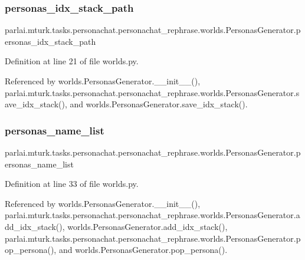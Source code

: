 \subsubsection{\texorpdfstring{personas\+\_\+idx\+\_\+stack\+\_\+path}{personas\_idx\_stack\_path}}
{\footnotesize\ttfamily parlai.\+mturk.\+tasks.\+personachat.\+personachat\+\_\+rephrase.\+worlds.\+Personas\+Generator.\+personas\+\_\+idx\+\_\+stack\+\_\+path}



Definition at line 21 of file worlds.\+py.



Referenced by worlds.\+Personas\+Generator.\+\_\+\+\_\+init\+\_\+\+\_\+(), parlai.\+mturk.\+tasks.\+personachat.\+personachat\+\_\+rephrase.\+worlds.\+Personas\+Generator.\+save\+\_\+idx\+\_\+stack(), and worlds.\+Personas\+Generator.\+save\+\_\+idx\+\_\+stack().

\mbox{\label{classparlai_1_1mturk_1_1tasks_1_1personachat_1_1personachat__rephrase_1_1worlds_1_1PersonasGenerator_ab4a565162feafbcbc20f9f6029c41f34}} 
\subsubsection{\texorpdfstring{personas\+\_\+name\+\_\+list}{personas\_name\_list}}
{\footnotesize\ttfamily parlai.\+mturk.\+tasks.\+personachat.\+personachat\+\_\+rephrase.\+worlds.\+Personas\+Generator.\+personas\+\_\+name\+\_\+list}



Definition at line 33 of file worlds.\+py.



Referenced by worlds.\+Personas\+Generator.\+\_\+\+\_\+init\+\_\+\+\_\+(), parlai.\+mturk.\+tasks.\+personachat.\+personachat\+\_\+rephrase.\+worlds.\+Personas\+Generator.\+add\+\_\+idx\+\_\+stack(), worlds.\+Personas\+Generator.\+add\+\_\+idx\+\_\+stack(), parlai.\+mturk.\+tasks.\+personachat.\+personachat\+\_\+rephrase.\+worlds.\+Personas\+Generator.\+pop\+\_\+persona(), and worlds.\+Personas\+Generator.\+pop\+\_\+persona().

